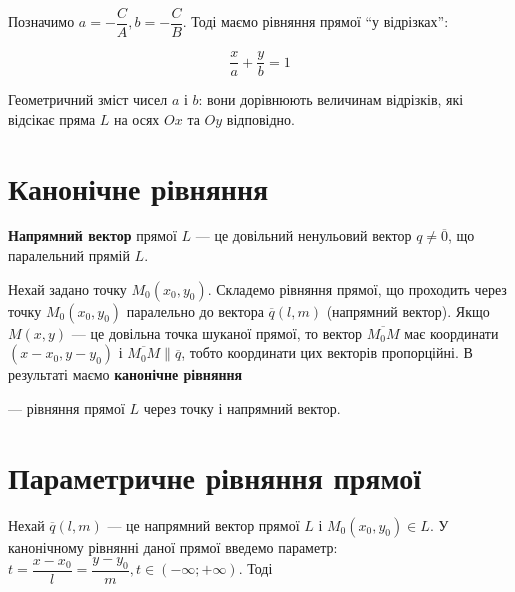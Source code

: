 Позначимо $a = -\dfrac{C}{A}, b = -\dfrac{C}{B}$. Тоді маємо рівняння прямої “у відрізках”:

$$\dfrac{x}{a} + \dfrac{y}{b} = 1$$

Геометричний зміст чисел $a$ і $b$: вони дорівнюють величинам відрізків, які
відсікає пряма $L$ на осях $Ox$ та $Oy$ відповідно.

\section{Канонічне рівняння}

\begin{definition}
	\textbf{Напрямний вектор} прямої $L$ --- це довільний ненульовий вектор $q \neq \overline{0}$, що паралельний прямій $L$.
\end{definition}

\parbox{100px}{}
\parbox{8.6cm}{
	Нехай задано точку $M_0(x_0, y_0)$. Складемо рівняння
	прямої, що проходить через точку $M_0(x_0, y_0)$
	паралельно до вектора $\overline{q}(l,m)$ (напрямний вектор).
	Якщо $M(x, y)$ --- це довільна точка шуканої прямої, то
	вектор $\overline{M_0M}$ має координати $(x-x_0, y-y_0)$ і $\overline{M_0M} \parallel \overline{q}$, тобто координати цих
	векторів пропорційні. В результаті маємо \textbf{канонічне рівняння}
}	
	
	\begin{center}
	\end{center}
	 --- рівняння прямої $L$ через точку і напрямний вектор.


\section{Параметричне рівняння прямої}

Нехай $\overline{q}(l, m)$ --- це напрямний вектор прямої $L$ і $M_0(x_0, y_0) \in L$. У канонічному
рівнянні даної прямої введемо параметр: $t = \dfrac{x-x_0}{l} = \dfrac{y-y_0}{m}, t \in (-\infty; +\infty)$. Тоді


